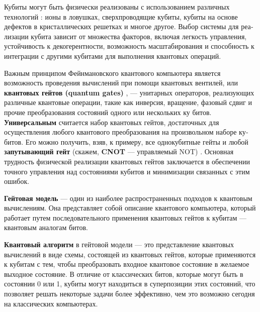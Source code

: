 Кубиты могут быть физически реализованы с использованием различных технологий \cite{valiev_1}: ионы в ловушках, сверхпроводящие кубиты, кубиты на основе дефектов в кристаллических решетках и многое другое. Выбор системы для реа­лизации кубита зависит от множества факторов, включая легкость управления, устойчивость к декогерентности, возможность масштабирования и способность к интеграции с другими кубитами для выполнения квантовых операций.

Важным принципом Фейнмановского квантового компьютера является возможность проведения вычислений при помощи квантовых вентилей, или \textbf{квантовых гейтов (quantum gates)} \cite{valiev_1,valiev_2}, --- унитарных операторов, ре­ализующих различные квантовые операции, такие как инверсия, вращение, фазовый сдвиг и прочие преобразования состояний одного или нескольких ку­ битов. \textbf{Универсальным} считается набор квантовых гейтов, достаточных для осуществления любого квантового преобразования на произвольном наборе ку­битов. Его можно получить, взяв, к примеру, все однокубитные гейты и любой \textbf{запутывающий гейт} (скажем, \textbf{CNOT} --- управляемый NOT) \cite{quantum_gates_barenco}. Основная трудность физической реализации квантовых гейтов заключается в обеспече­нии точного управления над состояниями кубитов и минимизации связанных с этим ошибок.

\textbf{Гейтовая модель} --- один из наиболее распространенных подходов к квантовым вычислениям. Она представляет собой описание квантового компьютера, который работает путем последовательного применения кван­товых гейтов к кубитам --- квантовым аналогам битов. 

\textbf{Квантовый алгоритм} в гейтовой модели --- это представление кван­товых вычислений в виде схемы, состоящей из квантовых гейтов, которые применяются к кубитам с тем, чтобы преобразовать входное квантовое состоя­ние в желаемое выходное состояние. В отличие от классических битов, которые могут быть в состоянии 0 или 1, кубиты могут находиться в суперпозиции этих состояний, что позволяет решать некоторые задачи более эффективно, чем это возможно сегодня на классических компьютерах.

\begin{figure}[h!]
	\noindent{}
\end{figure}

